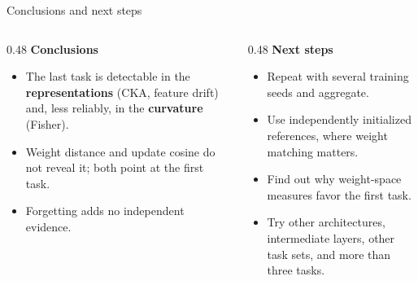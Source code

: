 \documentclass[aspectratio=169,11pt]{beamer}
\newcommand{\hl}[1]{{\color{accent}\bfseries #1}}
\begin{document}
\begin{frame}{Conclusions and next steps}
  \begin{columns}[T]
    \begin{column}{0.48\textwidth}
      \textbf{Conclusions}
      \begin{itemize}
        \item The last task is detectable in the \hl{representations} (CKA, feature drift) and, less reliably, in the \hl{curvature} (Fisher).
        \item Weight distance and update cosine do not reveal it; both point at the first task.
        \item Forgetting adds no independent evidence.
      \end{itemize}
    \end{column}
    \begin{column}{0.48\textwidth}
      \textbf{Next steps}
      \begin{itemize}
        \item Repeat with several training seeds and aggregate.
        \item Use independently initialized references, where weight matching matters.
        \item Find out why weight-space measures favor the first task.
        \item Try other architectures, intermediate layers, other task sets, and more than three tasks.
      \end{itemize}
    \end{column}
  \end{columns}
\end{frame}
\end{document}
